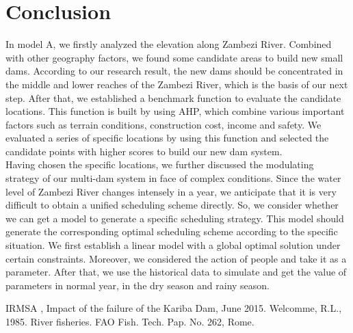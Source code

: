\documentclass{mcmthesis}
\begin{document}
\section{Conclusion}
\indent \indent In model A, we firstly analyzed the elevation along Zambezi River. Combined with other geography factors, we found some candidate areas to build new small dams. According to our research result, the new dams should be concentrated in the middle and lower reaches of the Zambezi River, which is the basis of our next step. After that, we established a benchmark function to evaluate the candidate locations. This function is built by using AHP, which combine various important factors such as terrain conditions, construction cost, income and safety. We evaluated a series of specific locations by using this function and selected the candidate points with higher scores to build our new dam system.\\
\indent Having chosen the specific locations, we further discussed the modulating strategy of our multi-dam system in face of complex conditions. Since the water level of Zambezi River changes intensely in a year, we anticipate that it is very difficult to obtain a unified scheduling scheme directly. So, we consider whether we can get a model to generate a specific scheduling strategy. This model should generate the corresponding optimal scheduling scheme according to the specific situation. We first establish a linear model with a global optimal solution under certain constraints. Moreover, we considered the action of people and take it as a parameter. After that, we use the historical data to simulate and get the value of parameters in normal year, in the dry season and rainy season.

\begin{thebibliography}{99}
 IRMSA , Impact of the failure of the Kariba Dam, June 2015.
 Welcomme, R.L., 1985. River fisheries. FAO Fish. Tech. Pap. No. 262, Rome.
\end{thebibliography}

\clearpage
\end{document}
